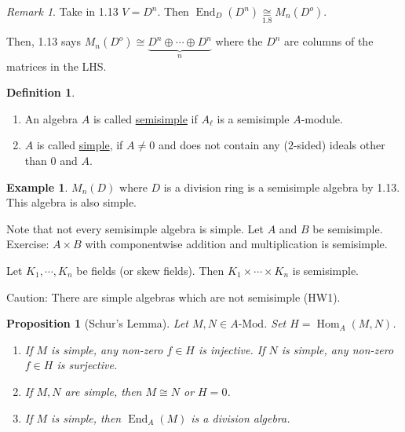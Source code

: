 \documentclass{article}
\theoremstyle{definition}
\newtheorem*{example}{Example}
\newtheorem*{definition}{Definition}
\theoremstyle{plain}
\newtheorem{proposition}[theorem]{Proposition}
\theoremstyle{remark}
\newtheorem*{remark*}{Remark}
\begin{document}
    \begin{remark*}
        Take in 1.13 \(V = D^n\). Then \(\operatorname{End}_D(D^n) \underset{1.8}{\cong} M_n(D^o)\).

        Then, 1.13 says \(M_n(D^o) \cong \underbrace{D^n \oplus \cdots \oplus D^n}_{n}\) where the \(D^n\) are columns of the matrices in the LHS. 
    \end{remark*}

    \begin{definition}
        \begin{enumerate}[label=\arabic*)]
            \item An algebra \(A\) is called \underline{semisimple} if \(A_\ell\) is a semisimple \(A\)-module.
            \item \(A\) is called \underline{simple}, if \(A\neq 0\) and does not contain any (\(2\)-sided) ideals other than \(0\) and \(A\).
        \end{enumerate} 
    \end{definition}

    \begin{example}
        \(M_n(D)\) where \(D\) is a division ring is a semisimple algebra by 1.13. This algebra is also simple.

        Note that not every semisimple algebra is simple. Let \(A\) and \(B\) be semisimple. Exercise: \(A \times B\) with componentwise addition and multiplication is semisimple.

        Let \(K_1 , \cdots , K_n\) be fields (or skew fields). Then \(K_1 \times \cdots \times K_n\) is semisimple.
    \end{example}

    Caution: There are simple algebras which are not semisimple (HW1).

    \begin{proposition}
        [Schur's Lemma]

        Let \(M, N \in A\text{-Mod}\). Set \(H = \operatorname{Hom}_A(M,N)\).

        \begin{enumerate}[label=\roman*)]
            \item If \(M\) is simple, any non-zero \(f\in H\) is injective. If \(N\) is simple, any non-zero \(f\in H\) is surjective.
            \item If \(M, N\) are simple, then \(M\cong N\) or \(H = 0\).
            \item If \(M\) is simple, then \(\operatorname{End}_A(M)\) is a division algebra.
        \end{enumerate} 
    \end{proposition}
\end{document}
